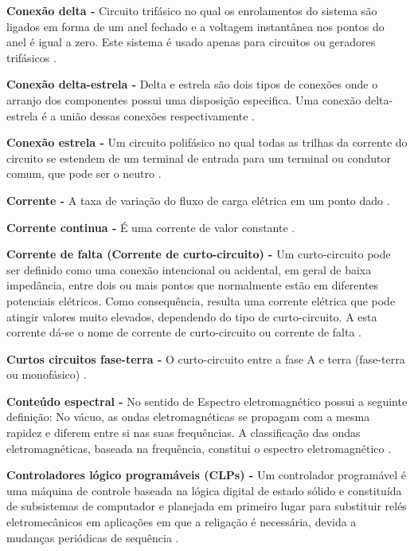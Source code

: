 \noindent
\textbf{Conexão delta -} Circuito trifásico no qual os enrolamentos do sistema são ligados em forma de um anel fechado e a voltagem instantânea nos pontos do anel é igual a zero. Este sistema é usado apenas para circuitos ou geradores trifásicos \citep{GAR82}.

\noindent
\textbf{Conexão delta-estrela -} Delta e estrela são dois tipos de conexões onde o arranjo dos componentes possui uma disposição especifica. Uma conexão delta-estrela é a união dessas conexões respectivamente \citep{SAD03}.

\noindent
\textbf{Conexão estrela -} Um circuito polifásico no qual todas as trilhas da corrente do circuito se estendem de um terminal de entrada para um terminal ou condutor comum, que pode ser o neutro \citep{GAR82}.

\noindent
\textbf{Corrente -} A taxa de variação do fluxo de carga elétrica em um ponto dado \citep{DOR08}.

\noindent
\textbf{Corrente continua -} É uma corrente de valor constante \citep{DOR08}.

\noindent
\textbf{Corrente de falta (Corrente de curto-circuito) -} Um curto-circuito pode ser definido como uma conexão intencional ou acidental, em geral de baixa impedância, entre dois ou mais pontos que normalmente estão em diferentes potenciais elétricos. Como consequência, resulta uma corrente elétrica que pode atingir valores muito elevados, dependendo do tipo de curto-circuito. A esta corrente dá-se o nome de corrente de curto-circuito ou corrente de falta \citep{SAN09}.

\noindent
\textbf{Curtos circuitos fase-terra -} O curto-circuito entre a fase A e terra (fase-terra ou monofásico) \citep{SAN09}.

\noindent
\textbf{Conteúdo espectral -} No sentido de Espectro eletromagnético possui a seguinte definição: No vácuo, as ondas eletromagnéticas se propagam com a mesma rapidez e diferem entre si nas suas frequências. A classificação das ondas eletromagnéticas, baseada na frequência, constitui o espectro eletromagnético \citep{HET02}.

\noindent
\textbf{Controladores lógico programáveis (CLPs) -} Um controlador programável é uma máquina de controle baseada na lógica digital de estado sólido e constituída de subsistemas de computador e planejada em primeiro lugar para substituir relés eletromecânicos em aplicações em que a religação é necessária, devida a mudanças periódicas de sequência \citep{GAR82}.

